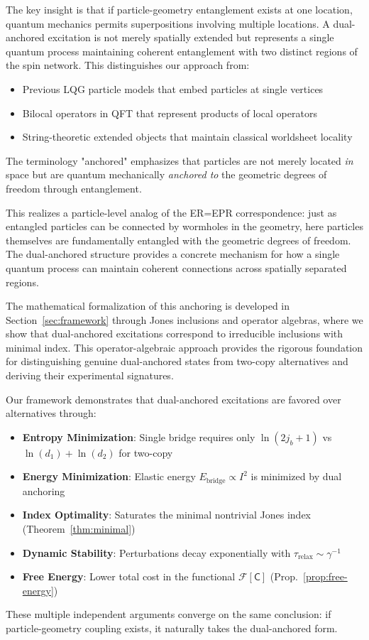 \documentclass[11pt]{article}
\theoremstyle{plain}
\theoremstyle{definition}
\begin{document}
The key insight is that if particle-geometry entanglement exists at one location, quantum mechanics permits superpositions involving multiple locations. A dual-anchored excitation is not merely spatially extended but represents a single quantum process maintaining coherent entanglement with two distinct regions of the spin network. This distinguishes our approach from:
\begin{itemize}
  \item Previous LQG particle models that embed particles at single vertices
  \item Bilocal operators in QFT that represent products of local operators
  \item String-theoretic extended objects that maintain classical worldsheet locality
\end{itemize}

The terminology "anchored" emphasizes that particles are not merely located \emph{in} space but are quantum mechanically \emph{anchored to} the geometric degrees of freedom through entanglement.

This realizes a particle-level analog of the ER=EPR correspondence: just as entangled particles can be connected by wormholes in the geometry, here particles themselves are fundamentally entangled with the geometric degrees of freedom. The dual-anchored structure provides a concrete mechanism for how a single quantum process can maintain coherent connections across spatially separated regions.

The mathematical formalization of this anchoring is developed in Section~\ref{sec:framework} through Jones inclusions and operator algebras, where we show that dual-anchored excitations correspond to irreducible inclusions with minimal index. This operator-algebraic approach provides the rigorous foundation for distinguishing genuine dual-anchored states from two-copy alternatives and deriving their experimental signatures.

\begin{tcolorbox}[title=Why Dual-Anchored Excitations are Physically Preferred]
  Our framework demonstrates that dual-anchored excitations are favored over alternatives through:
  \begin{itemize}
    \item \textbf{Entropy Minimization}: Single bridge requires only $\ln(2j_b+1)$ vs $\ln(d_1) + \ln(d_2)$ for two-copy
    \item \textbf{Energy Minimization}: Elastic energy $E_{\text{bridge}} \propto I^2$ is minimized by dual anchoring
    \item \textbf{Index Optimality}: Saturates the minimal nontrivial Jones index (Theorem~\ref{thm:minimal})
    \item \textbf{Dynamic Stability}: Perturbations decay exponentially with $\tau_{\text{relax}} \sim \gamma^{-1}$
    \item \textbf{Free Energy}: Lower total cost in the functional $\mathcal{F}[\mathsf{C}]$ (Prop.~\ref{prop:free-energy})
  \end{itemize}
  These multiple independent arguments converge on the same conclusion: if particle-geometry coupling exists, it naturally takes the dual-anchored form.
\end{tcolorbox}
\end{document}
